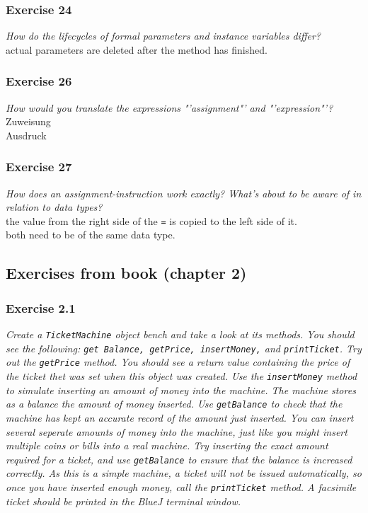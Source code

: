 \subsubsection*{Exercise 24}
\textit{How do the lifecycles of formal parameters and instance variables 
	differ?}\\
actual parameters are deleted after the method has finished. 

\subsubsection*{Exercise 26}
\textit{How would you translate the expressions "'assignment"' and 
	"'expression"'?}\\
Zuweisung \\
Ausdruck

\subsubsection*{Exercise 27}
\textit{How does an assignment-instruction work exactly? What's about to 
	be aware of in relation to data types?}\\
the value from the right side of the \lstinline{=} is copied to the left side of it. 
\\
both need to be of the same data type. 

\subsection{Exercises from book (chapter 2)}
\subsubsection*{Exercise 2.1}
\textit{Create a \lstinline{TicketMachine} object bench and take a look at its 
methods. You should see the following: 
\lstinline{get Balance, getPrice, insertMoney,} and \lstinline{printTicket}. Try out the 
\lstinline{getPrice} method. You should see a return value containing the price of 
the ticket thet was set when this object was created. Use the 
\lstinline{insertMoney} method to simulate inserting an amount of money into the 
machine. The machine stores as a balance the amount of money inserted. Use 
\lstinline{getBalance} to check that the machine has kept an accurate record of the 
amount just inserted. You can insert several seperate amounts of money into the 
machine, just like you might insert multiple coins or bills into a real 
machine. Try inserting the exact amount required for a ticket, and use 
\lstinline{getBalance} to ensure that the balance is increased correctly. As this 
is a simple machine, a ticket will not be issued automatically, so once you 
have inserted enough money, call the \lstinline{printTicket} method. A facsimile 
ticket should be printed in the BlueJ terminal window. }


